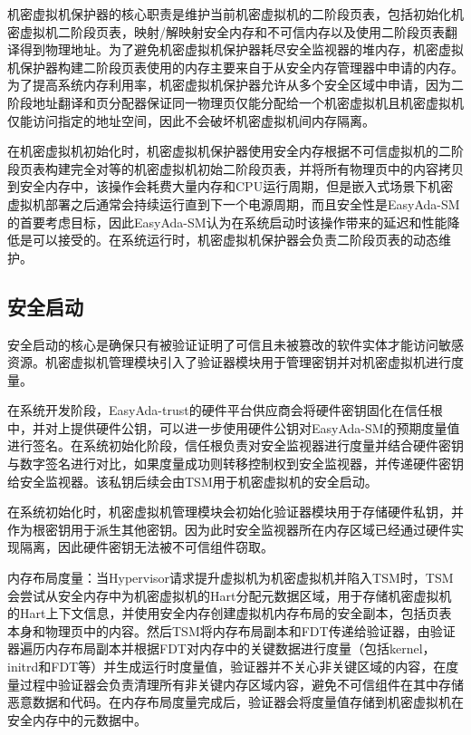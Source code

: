 \documentclass[master, vlined, review]{DissertUESTC}
\begin{document}
	机密虚拟机保护器的核心职责是维护当前机密虚拟机的二阶段页表，包括初始化机密虚拟机二阶段页表，映射/解映射安全内存和不可信内存以及使用二阶段页表翻译得到物理地址。为了避免机密虚拟机保护器耗尽安全监视器的堆内存，机密虚拟机保护器构建二阶段页表使用的内存主要来自于从安全内存管理器中申请的内存。为了提高系统内存利用率，机密虚拟机保护器允许从多个安全区域中申请，因为二阶段地址翻译和页分配器保证同一物理页仅能分配给一个机密虚拟机且机密虚拟机仅能访问指定的地址空间，因此不会破坏机密虚拟机间内存隔离。
	
	在机密虚拟机初始化时，机密虚拟机保护器使用安全内存根据不可信虚拟机的二阶段页表构建完全对等的机密虚拟机初始二阶段页表，并将所有物理页中的内容拷贝到安全内存中，该操作会耗费大量内存和CPU运行周期，但是嵌入式场景下机密虚拟机部署之后通常会持续运行直到下一个电源周期，而且安全性是EasyAda-SM的首要考虑目标，因此EasyAda-SM认为在系统启动时该操作带来的延迟和性能降低是可以接受的。在系统运行时，机密虚拟机保护器会负责二阶段页表的动态维护。
	
	\subsection{安全启动}
	安全启动的核心是确保只有被验证证明了可信且未被篡改的软件实体才能访问敏感资源。机密虚拟机管理模块引入了验证器模块用于管理密钥并对机密虚拟机进行度量。
	
	在系统开发阶段，EasyAda-trust的硬件平台供应商会将硬件密钥固化在信任根中，并对上提供硬件公钥，可以进一步使用硬件公钥对EasyAda-SM的预期度量值进行签名。在系统初始化阶段，信任根负责对安全监视器进行度量并结合硬件密钥与数字签名进行对比，如果度量成功则转移控制权到安全监视器，并传递硬件密钥给安全监视器。该私钥后续会由TSM用于机密虚拟机的安全启动。
	
	在系统初始化时，机密虚拟机管理模块会初始化验证器模块用于存储硬件私钥，并作为根密钥用于派生其他密钥。因为此时安全监视器所在内存区域已经通过硬件实现隔离，因此硬件密钥无法被不可信组件窃取。
	
	内存布局度量：当Hypervisor请求提升虚拟机为机密虚拟机并陷入TSM时，TSM会尝试从安全内存中为机密虚拟机的Hart分配元数据区域，用于存储机密虚拟机的Hart上下文信息，并使用安全内存创建虚拟机内存布局的安全副本，包括页表本身和物理页中的内容。然后TSM将内存布局副本和FDT传递给验证器，由验证器遍历内存布局副本并根据FDT对内存中的关键数据进行度量（包括kernel，initrd和FDT等）并生成运行时度量值，验证器并不关心非关键区域的内容，在度量过程中验证器会负责清理所有非关键内存区域内容，避免不可信组件在其中存储恶意数据和代码。在内存布局度量完成后，验证器会将度量值存储到机密虚拟机在安全内存中的元数据中。
	
\end{document}
